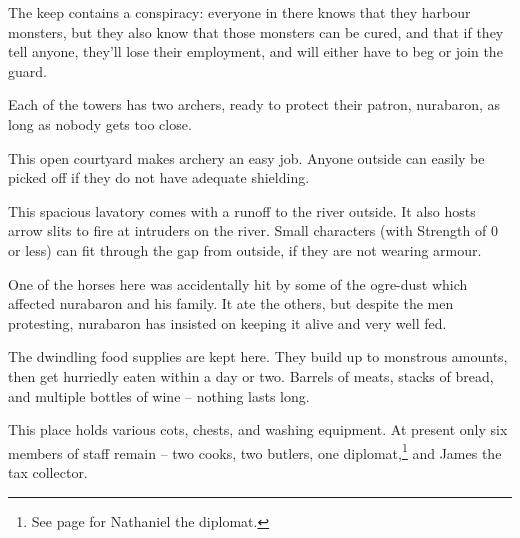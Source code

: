 \begin{multicols}{2}
The keep contains a conspiracy: everyone in there knows that they harbour monsters, but they also know that those monsters can be cured, and that if they tell anyone, they'll lose their employment, and will either have to beg or join the \gls{guard}.

\label{redTower}

Each of the towers has two archers, ready to protect their patron, \gls{nurabaron}, as long as nobody gets too close.




\label{redYard}

This open courtyard makes archery an easy job.  Anyone outside can easily be picked off if they do not have adequate shielding.

\label{redToilet}

This spacious lavatory comes with a runoff to the river outside.
It also hosts arrow slits to fire at intruders on the river.
Small characters (with Strength of 0 or less) can fit through the gap from outside, if they are not wearing armour.

One of the horses here was accidentally hit by some of the ogre-dust which affected \gls{nurabaron} and his family.  It ate the others, but despite the men protesting, \gls{nurabaron} has insisted on keeping it alive and very well fed.

\label{redKitchen}

The dwindling food supplies are kept here.  They build up to monstrous amounts, then get hurriedly eaten within a day or two.  Barrels of meats, stacks of bread, and multiple bottles of wine -- nothing lasts long.

\label{redServants}

This place holds various cots, chests, and washing equipment.  At present only six members of staff remain -- two cooks, two butlers, one diplomat,\footnote{See page \pageref{nathaniel} for Nathaniel the diplomat.} and James the tax collector.


\end{multicols}
